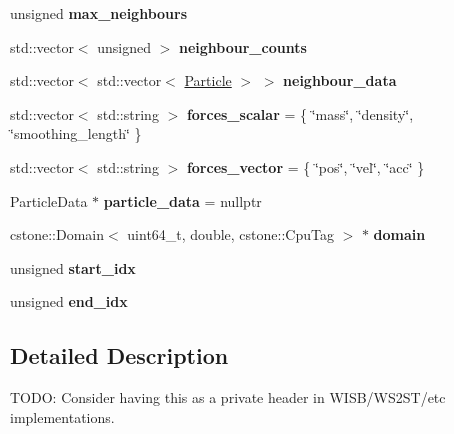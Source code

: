 \begin{DoxyCompactItemize}
\item 
\mbox{\label{namespacewash_a17d27449eff38aaca1e4206070bbb868}} 
unsigned {\bfseries max\+\_\+neighbours}
\item 
\mbox{\label{namespacewash_a15b300d4e8a12c38c1e54650db4476f1}} 
std\+::vector$<$ unsigned $>$ {\bfseries neighbour\+\_\+counts}
\item 
\mbox{\label{namespacewash_aa6580757775fdbcb82b9a6b6f75332a1}} 
std\+::vector$<$ std\+::vector$<$ \mbox{\hyperlink{classwash_1_1Particle}{Particle}} $>$ $>$ {\bfseries neighbour\+\_\+data}
\item 
\mbox{\label{namespacewash_a9c297685f13f82d6f804157081b56402}} 
std\+::vector$<$ std\+::string $>$ {\bfseries forces\+\_\+scalar} = \{ \char`\"{}mass\char`\"{}, \char`\"{}density\char`\"{}, \char`\"{}smoothing\+\_\+length\char`\"{} \}
\item 
\mbox{\label{namespacewash_a0dce58e51e269cb2298f5ec6648f28ab}} 
std\+::vector$<$ std\+::string $>$ {\bfseries forces\+\_\+vector} = \{ \char`\"{}pos\char`\"{}, \char`\"{}vel\char`\"{}, \char`\"{}acc\char`\"{} \}
\item 
\mbox{\label{namespacewash_ae61aecb586450fdd500b953593701239}} 
Particle\+Data $\ast$ {\bfseries particle\+\_\+data} = nullptr
\item 
\mbox{\label{namespacewash_a53e8b34558bb0851dd0c229c8d720f28}} 
cstone\+::\+Domain$<$ uint64\+\_\+t, double, cstone\+::\+Cpu\+Tag $>$ $\ast$ {\bfseries domain}
\item 
\mbox{\label{namespacewash_a820391e694539fac01ed9916b92b427c}} 
unsigned {\bfseries start\+\_\+idx}
\item 
\mbox{\label{namespacewash_a46edd0c40cbb3607c190c2acab5fe7b4}} 
unsigned {\bfseries end\+\_\+idx}
\end{DoxyCompactItemize}


\subsection{Detailed Description}
T\+O\+DO\+: Consider having this as a private header in W\+I\+S\+B/\+W\+S2\+S\+T/etc implementations. 

